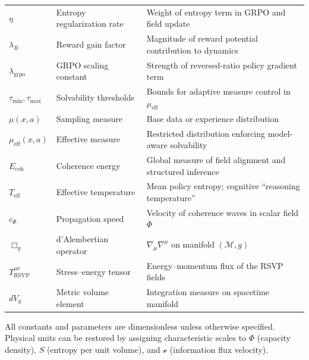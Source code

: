 \documentclass[11pt]{article}
\begin{document}
\begin{center}
\begin{tabular}{lll}
$\eta$ & Entropy regularization rate & Weight of entropy term in GRPO and field update \\
$\lambda_R$ & Reward gain factor & Magnitude of reward potential contribution to dynamics \\
$\lambda_{\mathrm{grpo}}$ & GRPO scaling constant & Strength of reversed-ratio policy gradient term \\
$\tau_{\min},\tau_{\max}$ & Solvability thresholds & Bounds for adaptive measure control in $\mu_{\mathrm{eff}}$ \\
$\mu(x,a)$ & Sampling measure & Base data or experience distribution \\
$\mu_{\mathrm{eff}}(x,a)$ & Effective measure & Restricted distribution enforcing model-aware solvability \\
$E_{\mathrm{coh}}$ & Coherence energy & Global measure of field alignment and structured inference \\
$T_{\mathrm{eff}}$ & Effective temperature & Mean policy entropy; cognitive “reasoning temperature” \\
$c_\Phi$ & Propagation speed & Velocity of coherence waves in scalar field $\Phi$ \\
$\Box_g$ & d’Alembertian operator & $\nabla_\mu\nabla^\mu$ on manifold $(\mathcal{M},g)$ \\
$T^{\mu\nu}_{\mathrm{RSVP}}$ & Stress–energy tensor & Energy–momentum flux of the RSVP fields \\
$dV_g$ & Metric volume element & Integration measure on spacetime manifold \\
\bottomrule
\end{tabular}
\end{center}

\bigskip
\noindent
All constants and parameters are dimensionless unless otherwise specified.  
Physical units can be restored by assigning characteristic scales to $\Phi$ (capacity density), $S$ (entropy per unit volume), and $\mathcal{v}$ (information flux velocity).
\end{document}
